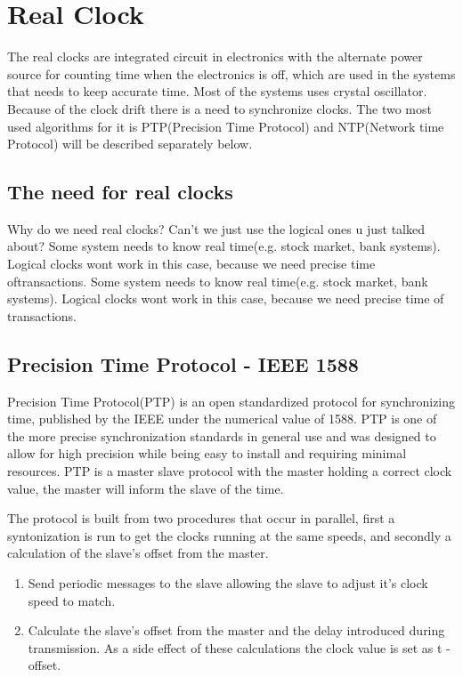 \section{Real Clock}\label{sc:realClock}

The real clocks are integrated circuit in electronics with the alternate power source for counting time when the electronics is off, which are used in the systems that needs to keep accurate time. Most of the systems uses crystal oscillator. Because of the clock drift there is a need to synchronize clocks. The two most used algorithms for it is PTP(Precision Time Protocol) and NTP(Network time Protocol) will be described separately below.

\subsection{The need for real clocks}

Why do we need real clocks? Can't we just use the logical ones u just talked about?
Some system needs to know real time(e.g. stock market, bank systems). Logical clocks wont work in this case, because we need precise time oftransactions.
Some system needs to know real time(e.g. stock market, bank systems). Logical clocks wont work in this
case, because we need precise time of transactions.


\subsection{Precision Time Protocol - IEEE 1588}

Precision Time Protocol(PTP) is an open standardized protocol for synchronizing time, published by the IEEE under the numerical value of 1588. PTP is one of the more precise synchronization standards in general use and was designed to allow for high precision while being easy to install and requiring minimal resources. PTP is a master slave protocol with the master holding a correct clock value, the master will inform the slave of the time.

\noindent The protocol is built from two procedures that occur in parallel, first a syntonization is run to get the clocks running at the same speeds, and secondly a calculation of the slave's offset from the master. 
\begin{enumerate}
\item Send periodic messages to the slave allowing the slave to adjust it's clock speed to match.
\item Calculate the slave's offset from the master and the delay introduced during transmission. As a side effect of these calculations the clock value is set as t - offset.
\end{enumerate}

